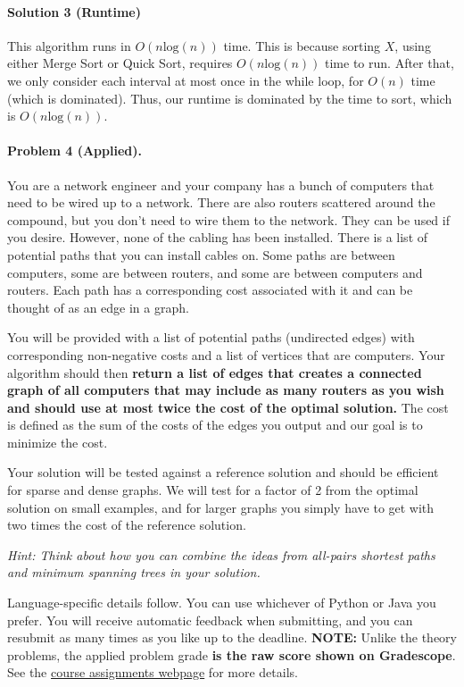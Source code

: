 \documentclass[11pt]{article}
\begin{document}
\paragraph{Solution 3 (Runtime)}

This algorithm runs in $O(n\text{log}(n))$ time. This is because sorting $X$, using either Merge Sort or Quick Sort, requires $O(n\text{log}(n))$ time to run. After that, we only consider each interval at most once in the while loop, for $O(n)$ time (which is dominated). Thus, our runtime is dominated by the time to sort, which is $O(n\text{log}(n))$.



\newpage
\paragraph{Problem 4 (Applied).} You are a network engineer and your company has a bunch of computers that need to be wired up to a network. There are also routers scattered around the compound, but you don't need to wire them to the network. They can be used if you desire. However, none of the cabling has been installed. There is a list of potential paths that you can install cables on. Some paths are between computers, some are between routers, and some are between computers and routers. Each path has a corresponding cost associated with it and can be thought of as an edge in a graph. 

You will be provided with a list of potential paths (undirected edges) with corresponding non-negative costs and a list of vertices that are computers. Your algorithm should then \textbf{return a list of edges that creates a connected graph of all computers that may include as many routers as you wish and should use at most twice the cost of the optimal solution.} The cost is defined as the sum of the costs of the edges you output and our goal is to minimize the cost. 

Your solution will be tested against a reference solution and should be efficient for sparse and dense graphs. We will test for a factor of 2 from the optimal solution on small examples, and for larger graphs you simply have to get with two times the cost of the reference solution.

\textit{Hint: Think about how you can combine the ideas from all-pairs shortest paths and minimum spanning trees in your solution.}

Language-specific details follow. You can use whichever of Python or Java you prefer. You will receive automatic feedback when submitting, and you can resubmit as many times as you like up to the deadline. \textbf{NOTE:} Unlike the theory problems, the applied problem grade \textbf{is the raw score shown on Gradescope}. See the \href{https://sites.duke.edu/spring24compsci330/assignments/}{course assignments webpage} for more details. 
\end{document}
